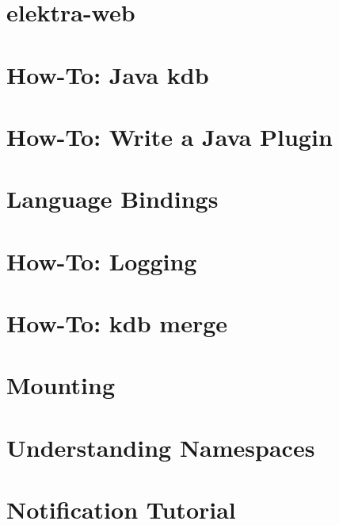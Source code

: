 \let\mypdfximage\pdfximage\def\pdfximage{\immediate\mypdfximage}\documentclass[twoside]{book}
\newcommand{\+}{\discretionary{\mbox{\scriptsize$\hookleftarrow$}}{}{}}
\begin{document}
\chapter{elektra-\/web}
\label{doc_tutorials_install-webui_md}

\chapter{How-\/\+To\+: Java kdb}
\label{doc_tutorials_java-kdb_md}

\chapter{How-\/\+To\+: Write a Java Plugin}
\label{doc_tutorials_java-plugins_md}

\chapter{Language Bindings}
\label{doc_tutorials_language-bindings_md}

\chapter{How-\/\+To\+: Logging}
\label{doc_tutorials_logger_md}

\chapter{How-\/\+To\+: kdb merge}
\label{doc_tutorials_merge_md}

\chapter{Mounting}
\label{doc_tutorials_mount_md}

\chapter{Understanding Namespaces}
\label{doc_tutorials_namespaces_md}

\chapter{Notification Tutorial}
\label{doc_tutorials_notifications_md}

\end{document}
